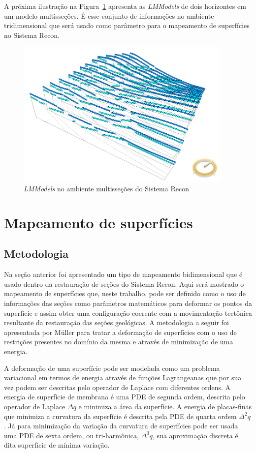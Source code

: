 A próxima ilustração na Figura~\ref{fig-lmmodel-ms} apresenta as \textit{LMModels} de dois horizontes em um modelo multisseções. É esse conjunto de informações no ambiente tridimensional que será usado como parâmetro para o mapeamento de superfícies no Sistema Recon.

\begin{figure} [h!]
  \begin{center}
    \includegraphics[width=300pt]{images/fig-lmmodel-ms}
    \caption{\textit{LMModels} no ambiente multisseções do Sistema Recon}\label{fig-lmmodel-ms}
  \end{center}
\end{figure}

\section{Mapeamento de superfícies}

\subsection{Metodologia}

Na seção anterior foi apresentado um tipo de mapeamento bidimensional que é usado dentro da restauração de seções do Sistema Recon. Aqui será mostrado o mapeamento de superfícies que, neste trabalho, pode ser definido como o uso de informações das seções como parâmetros matemáticos para deformar os pontos da superfície e assim obter uma configuração coerente com a movimentação tectônica resultante da restauração das seções geológicas. A metodologia a seguir foi apresentada por Müller\cite{Muller} para tratar a deformação de superfícies com o uso de restrições presentes no domínio da mesma e através de minimização de uma energia.

A deformação de uma superfície pode ser modelada como um problema variacional em termos de energia através de funções Lagrangeanas que por sua vez podem ser descritas pelo operador de Laplace com diferentes ordens. A energia de superfície de membrana é uma PDE de segunda ordem, descrita pelo operador de Laplace $\Delta{q}$ e minimiza a área da superfície. A energia de placas-finas que minimiza a curvatura da superfície é descrita pela PDE de quarta ordem $\Delta^2{q}$. Já para minimização da variação da curvatura de superfícies pode ser usada uma PDE de sexta ordem, ou tri-harmônica, $\Delta^3{q}$, sua aproximação discreta é dita superfície de mínima variação.\cite{Muller, Botsch}

